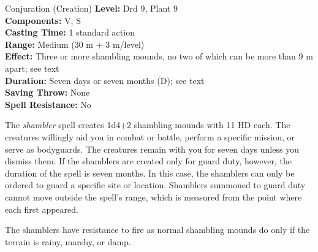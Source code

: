 {Conjuration (Creation)}
{
	\textbf{Level:}
	Drd 9, Plant 9\\
	\textbf{Components:}
	V, S\\
	\textbf{Casting Time:}
	1 standard action\\
	\textbf{Range:}
	Medium (30 m + 3 m/level)\\
	\textbf{Effect:}
	Three or more shambling mounds, no two of which can be more than 9 m apart; see text\\
	\textbf{Duration:}
	Seven days or seven months (D); see text\\
	\textbf{Saving Throw:}
	None\\
	\textbf{Spell Resistance:}
	No\\
}
{
	The \emph{shambler} spell creates 1d4+2 shambling mounds with 11 HD each. The creatures willingly aid you in combat or battle, perform a specific mission, or serve as bodyguards. The creatures remain with you for seven days unless you dismiss them. If the shamblers are created only for guard duty, however, the duration of the spell is seven months. In this case, the shamblers can only be ordered to guard a specific site or location. Shamblers summoned to guard duty cannot move outside the spell's range, which is measured from the point where each first appeared.

	The shamblers have resistance to fire as normal shambling mounds do only if the terrain is rainy, marshy, or damp.

}
